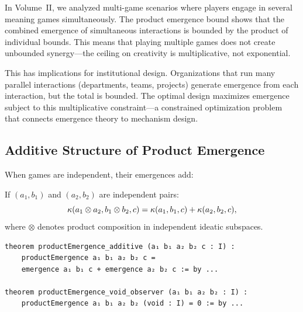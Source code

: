 \begin{interpretation}
In Volume~II, we analyzed multi-game scenarios where players engage in several
meaning games simultaneously. The product emergence bound shows that the
combined emergence of simultaneous interactions is bounded by the product of
individual bounds. This means that playing multiple games does not create
unbounded synergy---the ceiling on creativity is multiplicative, not exponential.

This has implications for institutional design. Organizations that run many
parallel interactions (departments, teams, projects) generate emergence from
each interaction, but the total is bounded. The optimal design maximizes
emergence subject to this multiplicative constraint---a constrained optimization
problem that connects emergence theory to mechanism design.
\end{interpretation}

\subsection{Additive Structure of Product Emergence}

When games are independent, their emergences add:

\begin{theorem}
\label{thm:product-emergence-additive}
If $(a_1, b_1)$ and $(a_2, b_2)$ are independent pairs:
\[
  \kappa(a_1 \otimes a_2, b_1 \otimes b_2, c) =
  \kappa(a_1, b_1, c) + \kappa(a_2, b_2, c),
\]
where $\otimes$ denotes product composition in independent ideatic subspaces.
\end{theorem}

\begin{lstlisting}[caption={Product emergence additivity (IDT\_v3\_Emergence.lean)}]
theorem productEmergence_additive (a₁ b₁ a₂ b₂ c : I) :
    productEmergence a₁ b₁ a₂ b₂ c =
    emergence a₁ b₁ c + emergence a₂ b₂ c := by ...

theorem productEmergence_void_observer (a₁ b₁ a₂ b₂ : I) :
    productEmergence a₁ b₁ a₂ b₂ (void : I) = 0 := by ...
\end{lstlisting}

